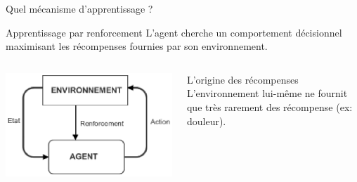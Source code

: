 \documentclass[xcolor=pst,dvips,12pt,english,french]{beamer}
\begin{document}
	\begin{frame}{Quel mécanisme d'apprentissage ?}
		\begin{block}{Apprentissage par renforcement}
			L'agent cherche un comportement décisionnel maximisant les \og récompenses \fg{} fournies par son environnement.
		\end{block}
		\begin{columns}
			\begin{column}{0.45\textwidth}
				\centering
				\includegraphics[width=\textwidth]{images/RL1.eps}
			\end{column}
			\begin{column}{0.5\textwidth}
				\begin{exampleblock}{L'origine des récompenses}
					L'environnement lui-même ne fournit que très rarement des \og récompense \fg{} (ex: douleur). 
				\end{exampleblock}
			\end{column}
		\end{columns}
	\end{frame}
	
\end{document}
